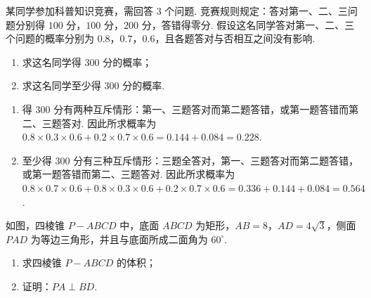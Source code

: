 \begin{problem}
某同学参加科普知识竞赛，需回答 \(3\) 个问题. 竞赛规则规定：答对第一、二、三问题分别得 \(100\) 分，\(100\) 分，\(200\) 分，答错得零分. 假设这名同学答对第一、二、三个问题的概率分别为 \(0.8\)，\(0.7\)，\(0.6\)，且各题答对与否相互之间没有影响.

\begin{enumerate}
\item 求这名同学得 \(300\) 分的概率；
\item 求这名同学至少得 \(300\) 分的概率.
\end{enumerate}
\end{problem}

\begin{solution}
\begin{enumerate}
\item 得 \(300\) 分有两种互斥情形：第一、三题答对而第二题答错，或第一题答错而第二、三题答对. 因此所求概率为 \(0.8\times0.3\times0.6+0.2\times0.7\times0.6=0.144+0.084=0.228\).
\item 至少得 \(300\) 分有三种互斥情形：三题全答对，第一、三题答对而第二题答错，或第一题答错而第二、三题答对. 因此所求概率为 \(0.8\times0.7\times0.6+0.8\times0.3\times0.6+0.2\times0.7\times0.6=0.336+0.144+0.084=0.564\).
\end{enumerate}
\end{solution}

\begin{problem}
如图，四棱锥 \(P - ABCD\) 中，底面 \(ABCD\) 为矩形，\(AB = 8\)，\(AD = 4\sqrt{3}\)，侧面 \(PAD\) 为等边三角形，并且与底面所成二面角为 \(60^{\circ}\).

\begin{enumerate}
\item 求四棱锥 \(P - ABCD\) 的体积；
\item 证明：\(PA \perp BD\).
\end{enumerate}

\begin{center}
\end{center}
\end{problem}

